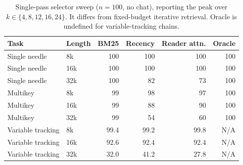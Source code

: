 \begin{table}[htbp]
\centering
\small
\setlength{\tabcolsep}{4pt}
\begin{tabular}{@{}llrrrr@{}}
\toprule
Task & Length & BM25 & Recency & Reader attn. & Oracle \\
\midrule
Single needle & 8k & 100 & 100 & 100 & 100 \\
Single needle & 16k & 100 & 100 & 100 & 100 \\
Single needle & 32k & 100 & 82 & 73 & 100 \\
Multikey & 8k & 99 & 98 & 97 & 100 \\
Multikey & 16k & 99 & 88 & 90 & 100 \\
Multikey & 32k & 99 & 54 & 60 & 100 \\
Variable tracking & 8k & 99.4 & 99.2 & 99.8 & N/A \\
Variable tracking & 16k & 92.6 & 92.4 & 92.4 & N/A \\
Variable tracking & 32k & 32.0 & 41.2 & 27.8 & N/A \\
\bottomrule
\end{tabular}
\caption{Single-pass selector sweep ($n=100$, no chat), reporting the peak over $k\in\{4,8,12,16,24\}$. It differs from fixed-budget iterative retrieval. Oracle is undefined for variable-tracking chains.}
\label{tab:selector-detail}
\end{table}
